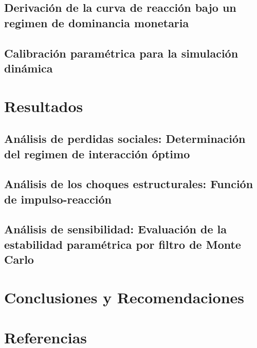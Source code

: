 \documentclass[
  man,
  longtable,
  nolmodern,
  notxfonts,
  notimes,
  colorlinks=true,linkcolor=blue,citecolor=blue,urlcolor=blue]{apa7}
\begin{document}
\subsection{Derivación de la curva de reacción bajo un regimen de
dominancia
monetaria}\label{derivaciuxf3n-de-la-curva-de-reacciuxf3n-bajo-un-regimen-de-dominancia-monetaria}

\subsection{Calibración paramétrica para la simulación
dinámica}\label{calibraciuxf3n-paramuxe9trica-para-la-simulaciuxf3n-dinuxe1mica}

\section{Resultados}\label{resultados}

\subsection{Análisis de perdidas sociales: Determinación del regimen de
interacción
óptimo}\label{anuxe1lisis-de-perdidas-sociales-determinaciuxf3n-del-regimen-de-interacciuxf3n-uxf3ptimo}

\subsection{Análisis de los choques estructurales: Función de
impulso-reacción}\label{anuxe1lisis-de-los-choques-estructurales-funciuxf3n-de-impulso-reacciuxf3n}

\subsection{Análisis de sensibilidad: Evaluación de la estabilidad
paramétrica por filtro de Monte
Carlo}\label{anuxe1lisis-de-sensibilidad-evaluaciuxf3n-de-la-estabilidad-paramuxe9trica-por-filtro-de-monte-carlo}

\section{Conclusiones y
Recomendaciones}\label{conclusiones-y-recomendaciones}

\section{Referencias}\label{referencias}
\end{document}
